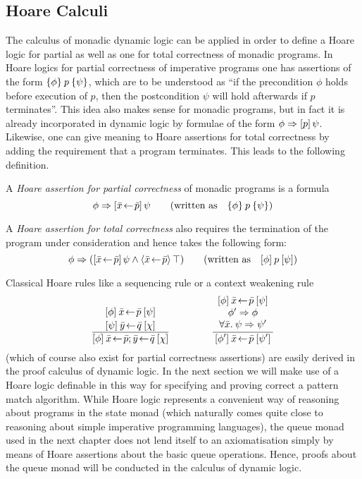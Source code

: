 \subsection{Hoare Calculi}
\label{sec:hoare-calculi}

The calculus of monadic dynamic logic can be applied in order to define a Hoare
logic for partial as well as one for total correctness of monadic programs. In
Hoare logics for partial correctness of imperative programs one has assertions
of the form $\{\phi\}\:p\:\{\psi\}$, which are to be understood as ``if the
precondition $\phi$ holds before execution of $p$, then the postcondition $\psi$ will
hold afterwards if $p$ terminates''. This idea also makes sense for monadic
programs, but in fact it is already incorporated in dynamic logic by formulae of
the form $\phi \Rightarrow [p]\,{\psi}$. Likewise, one can give meaning to Hoare assertions
for total correctness by adding the requirement that a program terminates. This
leads to the following definition.

\begin{defn}
  \label{defn:hoare-assns}
  A \emph{Hoare assertion for partial correctness} of monadic programs is a formula
  \[ \phi \Rightarrow [\bar x\!\gets\! \bar p]\,{\psi} \qquad (\text{written as} \quad
  \{\phi\}\:p\:\{\psi\}) \] 

  A \emph{Hoare assertion for total correctness} also requires the termination of the
  program under consideration and hence takes the following form:
  \[ \phi \Rightarrow ([\bar x\!\gets\! \bar p]\,{\psi} \land \langle\bar x\!\gets\!\bar p\rangle\,{\top})
  \qquad (\text{written as} \quad 
  [\phi]\:p\:[\psi]) \]
\end{defn}

Classical Hoare rules like a sequencing rule or a context weakening rule
\[
  \Rule{\displaystyle \datop{\THTriple{\phi}{\bar x\leteq\bar p}{\psi}} 
      {\THTriple{\psi}{\bar y\leteq\bar q}{\chi}}}
       {\THTriple{\phi}{\bar x\leteq\bar p; \bar y\leteq \bar q}{\chi}}
       \hspace*{15mm}
  \Rule{\begin{array}{c} \THTriple{\phi}{\bar x\leteq \bar p}{\psi} \\
             \phi' \Rightarrow \phi \\  \forall\bar x\bdot \psi \Rightarrow \psi' \end{array}}
       {\THTriple{\phi'}{\bar x\leteq\bar p}{\psi'}}
\]
(which of course also exist for partial correctness assertions) are easily
derived in the proof calculus of dynamic logic. In the next section we will  make
use of a Hoare logic definable in this way for specifying and 
proving correct a pattern match algorithm. While Hoare logic represents a
convenient way of reasoning about programs in the state monad (which naturally
comes quite close to reasoning about simple imperative programming languages),
\EG the queue monad used in the next chapter does not lend itself to an
axiomatisation simply by means of Hoare assertions about the basic queue
operations. Hence, proofs about the queue monad will be conducted in the
calculus of dynamic logic.

